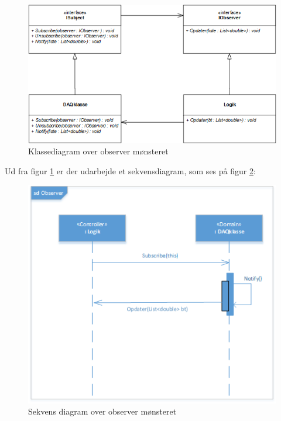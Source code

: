 \begin{figure}[H]
	\includegraphics[width=1\textwidth]{Figurer/Softwareimplementering/observer}
	\caption{Klassediagram over observer mønsteret}
	\label{observerdiagram}
\end{figure}

Ud fra figur \ref{observerdiagram} er der udarbejde et sekvensdiagram, som ses på figur \ref{observersekvens}:


\begin{figure}[H]
	\includegraphics[width=1\textwidth]{Figurer/Softwareimplementering/Observer_sekvens}
	\caption{Sekvens diagram over observer mønsteret}
	\label{observersekvens}
\end{figure}

